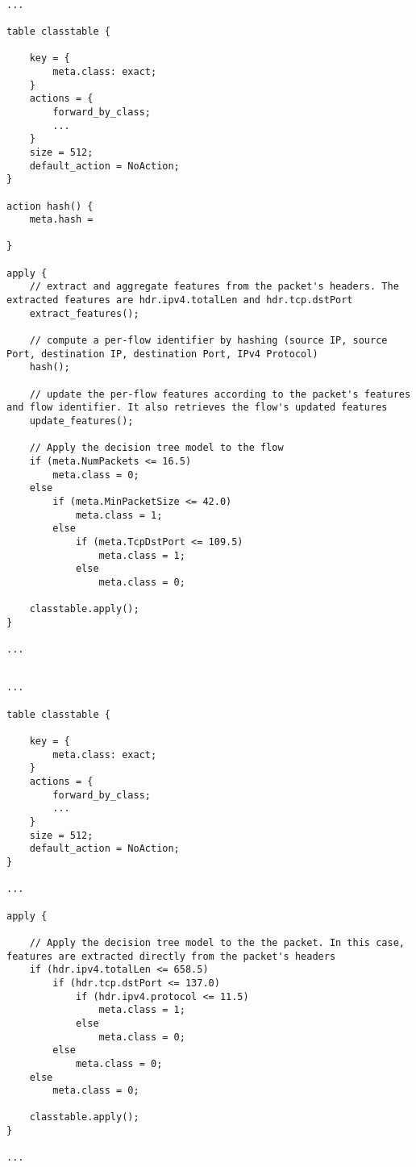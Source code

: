 
\begin{lstlisting}[float=t,caption={Main portions of the P4 code obtained by applying the \emph{ML to P4 Compiler} component to the per-flow tree of Figure \ref{fig:dtexample}.},label={lst:p4flow},frame=tb]

...

table classtable {

    key = {
        meta.class: exact;
    }
    actions = {
        forward_by_class;
        ...
    }
    size = 512;
    default_action = NoAction;
}

action hash() {
    meta.hash = 

} 

apply {
    // extract and aggregate features from the packet's headers. The extracted features are hdr.ipv4.totalLen and hdr.tcp.dstPort
    extract_features(); 

    // compute a per-flow identifier by hashing (source IP, source Port, destination IP, destination Port, IPv4 Protocol)
    hash();  
    
    // update the per-flow features according to the packet's features and flow identifier. It also retrieves the flow's updated features
    update_features(); 
   
    // Apply the decision tree model to the flow
    if (meta.NumPackets <= 16.5)
        meta.class = 0;
    else    
        if (meta.MinPacketSize <= 42.0)
            meta.class = 1;
        else    
            if (meta.TcpDstPort <= 109.5)
                meta.class = 1;
            else
                meta.class = 0;
    
    classtable.apply();                
}

...

\end{lstlisting}


\begin{lstlisting}[float=t,caption={{Main portions of the P4 code obtained by applying the \emph{ML to P4 Compiler} component to the per-packet tree of Figure \ref{fig:dtexample}}.},label={lst:p4pkt},frame=tb]

...

table classtable {

    key = {
        meta.class: exact;
    }
    actions = {
        forward_by_class;
        ...
    }
    size = 512;
    default_action = NoAction;
}

...

apply {

    // Apply the decision tree model to the the packet. In this case, features are extracted directly from the packet's headers
    if (hdr.ipv4.totalLen <= 658.5)
        if (hdr.tcp.dstPort <= 137.0)
            if (hdr.ipv4.protocol <= 11.5)
                meta.class = 1;
            else
                meta.class = 0;
        else
            meta.class = 0;
    else
        meta.class = 0;
    
    classtable.apply();                
}

...

\end{lstlisting}

\fi

